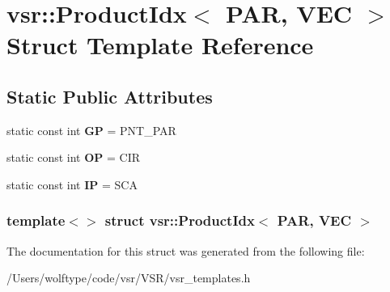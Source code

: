 \hypertarget{structvsr_1_1_product_idx_3_01_p_a_r_00_01_v_e_c_01_4}{\section{vsr\-:\-:Product\-Idx$<$ P\-A\-R, V\-E\-C $>$ Struct Template Reference}
\label{structvsr_1_1_product_idx_3_01_p_a_r_00_01_v_e_c_01_4}
}
\subsection*{Static Public Attributes}
\begin{DoxyCompactItemize}
\item 
\hypertarget{structvsr_1_1_product_idx_3_01_p_a_r_00_01_v_e_c_01_4_a3af84d2ae69bd8fb5d6ba4ece96b5124}{static const int {\bfseries G\-P} = P\-N\-T\-\_\-\-P\-A\-R}\label{structvsr_1_1_product_idx_3_01_p_a_r_00_01_v_e_c_01_4_a3af84d2ae69bd8fb5d6ba4ece96b5124}

\item 
\hypertarget{structvsr_1_1_product_idx_3_01_p_a_r_00_01_v_e_c_01_4_a821adfcf703e3d222effd63fec999ce1}{static const int {\bfseries O\-P} = C\-I\-R}\label{structvsr_1_1_product_idx_3_01_p_a_r_00_01_v_e_c_01_4_a821adfcf703e3d222effd63fec999ce1}

\item 
\hypertarget{structvsr_1_1_product_idx_3_01_p_a_r_00_01_v_e_c_01_4_a9ccb12fdc56813d23b959f64bb095d12}{static const int {\bfseries I\-P} = S\-C\-A}\label{structvsr_1_1_product_idx_3_01_p_a_r_00_01_v_e_c_01_4_a9ccb12fdc56813d23b959f64bb095d12}

\end{DoxyCompactItemize}
\subsubsection*{template$<$$>$ struct vsr\-::\-Product\-Idx$<$ P\-A\-R, V\-E\-C $>$}



The documentation for this struct was generated from the following file\-:\begin{DoxyCompactItemize}
\item 
/\-Users/wolftype/code/vsr/\-V\-S\-R/vsr\-\_\-templates.\-h\end{DoxyCompactItemize}
